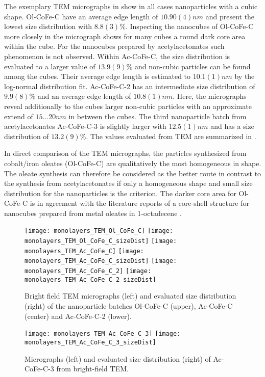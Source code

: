 \documentclass[\main/dresen_thesis.tex]{subfiles}
\begin{document}
  \label{sec:monolayers:nanoparticle:tem}
  The exemplary TEM micrographs in  show in all cases nanoparticles with a cubic shape.
  Ol-CoFe-C have an average edge length of $10.90(4) \unit{nm}$ and present the lowest size distribution with $8.8(3) \unit{\%}$.
  Inspecting the nanocubes of Ol-CoFe-C more closely in the micrograph shows for many cubes a round dark core area within the cube.
  For the nanocubes prepared by acetylacetonates such phenomenon is not observed.
  Within Ac-CoFe-C, the size distribution is evaluated to a larger value of $13.9(9) \unit{\%}$ and non-cubic particles can be found among the cubes.
  Their average edge length is estimated to $10.1(1) \unit{nm}$ by the log-normal distribution fit.
  Ac-CoFe-C-2 has an intermediate size distribution of $9.9(8) \%$ and an average edge length of $10.8(1) \unit{nm}$.
  Here, the micrographs reveal additionally to the cubes larger non-cubic particles with an approximate extend of $15 \ldots 20 \unit{nm}$ in between the cubes.
  The third nanoparticle batch from acetylacetonates Ac-CoFe-C-3 is slightly larger with $12.5(1) \unit{nm}$ and has a size distribution of $13.2(9) \%$.
  The values evaluated from TEM are summarized in .

  In direct comparison of the TEM micrographs, the particles synthesized from cobalt/iron oleates (Ol-CoFe-C) are qualitatively the most homogeneous in shape.
  The oleate synthesis can therefore be considered as the better route in contrast to the synthesis from acetylacetonates  if only a homogeneous shape and small size distribution for the nanoparticles is the criterion.
  The darker core area for Ol-CoFe-C is in agreement with the literature reports of a core-shell structure for nanocubes prepared from metal oleates in 1-octadecene \cite{Bao_2009_Forma, Bodnarchuk_2009_Excha, Wetterskog_2013_Anoma}.

  \begin{figure}[tb]
    \centering
    \texttt{[image: monolayers\_TEM\_Ol\_CoFe\_C]}
    \texttt{[image: monolayers\_TEM\_Ol\_CoFe\_C\_sizeDist]}
    \texttt{[image: monolayers\_TEM\_Ac\_CoFe\_C]}
    \texttt{[image: monolayers\_TEM\_Ac\_CoFe\_C\_sizeDist]}
    \texttt{[image: monolayers\_TEM\_Ac\_CoFe\_C\_2]}
    \texttt{[image: monolayers\_TEM\_Ac\_CoFe\_C\_2\_sizeDist]}
    \caption{\label{fig:monolayers:nanoparticle:tem}Bright field TEM micrographs (left) and evaluated size distribution (right) of the nanoparticle batches Ol-CoFe-C (upper), Ac-CoFe-C (center) and Ac-CoFe-C-2 (lower).}
  \end{figure}
  \begin{figure}[tb]
    \centering
    \texttt{[image: monolayers\_TEM\_Ac\_CoFe\_C\_3]}
    \texttt{[image: monolayers\_TEM\_Ac\_CoFe\_C\_3\_sizeDist]}
    \caption{\label{fig:monolayers:nanoparticle:tem2}Micrographs (left) and evaluated size distribution (right) of Ac-CoFe-C-3 from bright-field TEM.}
  \end{figure}
\end{document}
